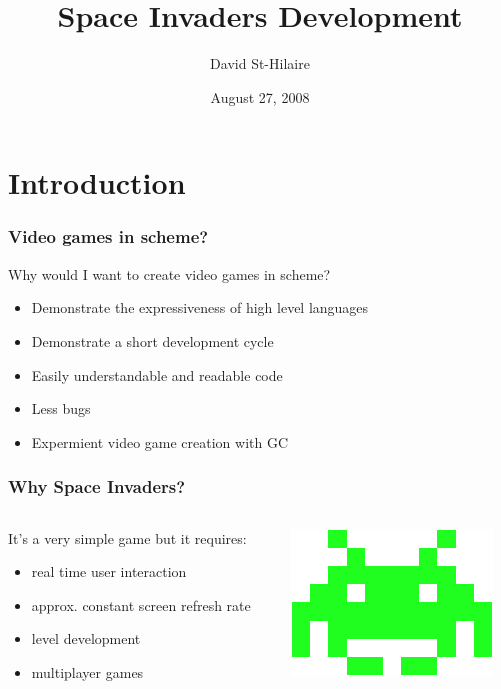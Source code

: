 \documentclass{beamer}
\title{Space Invaders Development}
\author{David St-Hilaire}
\date{August 27, 2008}
\newcommand{\<}[1]{\`#1}
\begin{document}
\begin{frame}
\titlepage
\end{frame}


\section{Introduction}

\begin{frame}
  \frametitle{Video games in scheme?}
  Why would I want to create video games in scheme?
  \begin{itemize}
  \item Demonstrate the expressiveness of high level languages
  \item Demonstrate a short development cycle
  \item Easily \alert{understandable} and \alert{readable} code
  \item Less bugs
  \item Expermient video game creation with GC
  \end{itemize}
\end{frame}

\begin{frame}
  \frametitle{Why Space Invaders?}

  \begin{columns}[c]
    \begin{column}{7cm} 
      It's a very simple game but it requires:
      \begin{itemize}
      \item real time user interaction
      \item approx. constant screen refresh rate
      \item level development
      \item multiplayer games
      \end{itemize}
    \end{column}
    \begin{column}{5cm} \includegraphics[scale=0.5]{medium} \end{column}
  \end{columns}
\end{frame}
\end{document}
